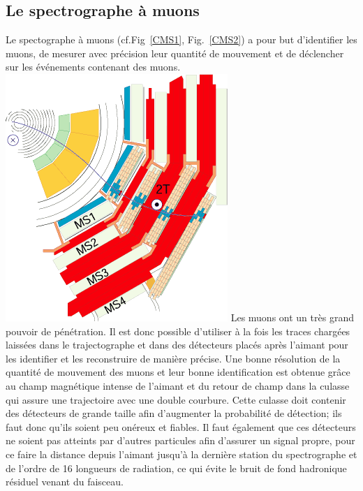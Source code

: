 \subsection{Le spectrographe à muons}
\label{RPCPRE}
Le spectographe à muons (cf.Fig~\ref{CMS1}, Fig.~\ref{CMS2}) a pour but d'identifier les muons, de mesurer avec précision leur quantité de mouvement et de déclencher sur les événements contenant des muons.
\marginpar
{
	\centering
	\includegraphics[width=\marginparwidth]{CMS/MUON.png}
	\label{MUON}
} Les muons ont un très grand pouvoir de pénétration. Il est donc possible d'utiliser à la fois les traces chargées laissées dans le trajectographe et dans des détecteurs placés après l'aimant pour les identifier et les reconstruire de manière précise. Une bonne résolution de la quantité de mouvement des muons et leur bonne identification est obtenue grâce au champ magnétique intense de l'aimant et du retour de champ dans la culasse qui assure une trajectoire avec une double courbure. Cette culasse doit contenir des détecteurs de grande taille afin d'augmenter la probabilité de détection; ils faut donc qu'ils soient peu onéreux et fiables. Il faut également que ces détecteurs ne soient pas atteints par d'autres particules afin d'assurer un signal propre, pour ce faire la distance depuis l'aimant jusqu'à la dernière station du spectrographe et de l'ordre de \num{16} longueurs de radiation, ce qui évite le bruit de fond hadronique résiduel venant du faisceau.

